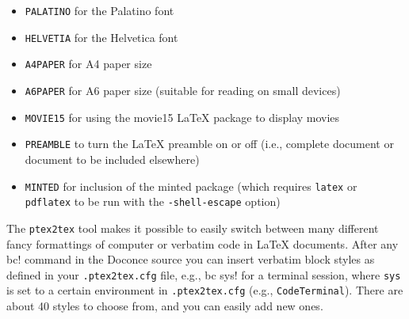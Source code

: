 \documentclass[%
oneside,                 %
final,                   %
10pt]{article}
\begin{document}
{{{\begin{itemize}
 \item {\fontsize{10pt}{10pt}\Verb!PALATINO!} for the Palatino font

 \item {\fontsize{10pt}{10pt}\Verb!HELVETIA!} for the Helvetica font

 \item {\fontsize{10pt}{10pt}\Verb!A4PAPER!} for A4 paper size

 \item {\fontsize{10pt}{10pt}\Verb!A6PAPER!} for A6 paper size (suitable for reading on small devices)

 \item {\fontsize{10pt}{10pt}\Verb!MOVIE15!} for using the movie15 {\LaTeX} package to display movies

 \item {\fontsize{10pt}{10pt}\Verb!PREAMBLE!} to turn the {\LaTeX} preamble on or off (i.e., complete document
   or document to be included elsewhere)

 \item {\fontsize{10pt}{10pt}\Verb!MINTED!} for inclusion of the minted package (which requires {\fontsize{10pt}{10pt}\Verb!latex!}
   or {\fontsize{10pt}{10pt}\Verb!pdflatex!} to be run with the {\fontsize{10pt}{10pt}\Verb!-shell-escape!} option)
\end{itemize}

\noindent
The {\fontsize{10pt}{10pt}\Verb!ptex2tex!} tool makes it possible to easily switch between many
different fancy formattings of computer or verbatim code in {\LaTeX}
documents. After any {\fontsize{10pt}{10pt}\Verb!!bc!} command in the Doconce source you can
insert verbatim block styles as defined in your {\fontsize{10pt}{10pt}\Verb!.ptex2tex.cfg!}
file, e.g., {\fontsize{10pt}{10pt}\Verb!!bc sys!} for a terminal session, where {\fontsize{10pt}{10pt}\Verb!sys!} is set to
a certain environment in {\fontsize{10pt}{10pt}\Verb!.ptex2tex.cfg!} (e.g., {\fontsize{10pt}{10pt}\Verb!CodeTerminal!}).
There are about 40 styles to choose from, and you can easily add
new ones.

}}}
\end{document}
